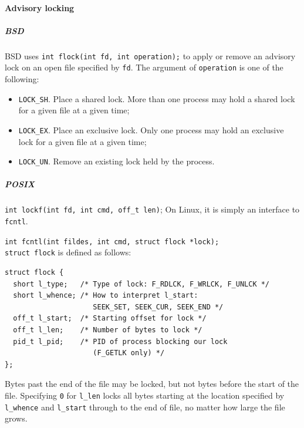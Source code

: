 \paragraph{Advisory locking}
\subparagraph{BSD}
BSD uses \texttt{int flock(int fd, int operation);} to apply or remove an advisory lock on an open file specified by \texttt{fd}. The argument of \texttt{operation} is one of the following:
\begin{itemize}
\item \texttt{LOCK\_SH}. Place a shared lock. More than one process may hold a shared lock for a given file at a given time;
\item \texttt{LOCK\_EX}. Place an exclusive lock. Only one process may hold an exclusive lock for a given file at a given time;
\item \texttt{LOCK\_UN}. Remove an existing lock held by the process.
\end{itemize}

\subparagraph{POSIX}
\texttt{int lockf(int fd, int cmd, off\_t len)}; On Linux, it is simply an interface to \texttt{fcntl}.

\texttt{int fcntl(int fildes, int cmd, struct flock *lock);}
\\
\texttt{struct flock} is defined as follows:
\begin{verbatim}
struct flock {
  short l_type;   /* Type of lock: F_RDLCK, F_WRLCK, F_UNLCK */
  short l_whence; /* How to interpret l_start:
                     SEEK_SET, SEEK_CUR, SEEK_END */
  off_t l_start;  /* Starting offset for lock */
  off_t l_len;    /* Number of bytes to lock */
  pid_t l_pid;    /* PID of process blocking our lock
                     (F_GETLK only) */
};
\end{verbatim}
Bytes past the end of the file may be locked, but not bytes before the start of the file. Specifying \texttt{0} for \texttt{l\_len} locks all bytes starting at the location specified by \texttt{l\_whence} and \texttt{l\_start} through to the end of file, no matter how large the file grows.

